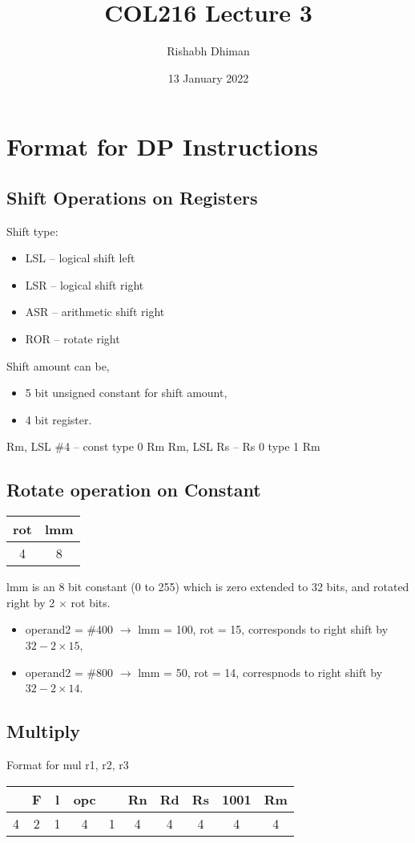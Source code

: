 \documentclass{scrartcl}
\title{COL216 Lecture 3}
\author{Rishabh Dhiman}
\date{13 January 2022}
\begin{document}
\maketitle

\section{Format for DP Instructions}

\subsection{Shift Operations on Registers}
Shift type:
\begin{itemize}
	\item LSL -- logical shift left
	\item LSR -- logical shift right
	\item ASR -- arithmetic shift right
	\item ROR -- rotate right
\end{itemize}
Shift amount can be,
\begin{itemize}
	\item 5 bit unsigned constant for shift amount,
	\item 4 bit register.
\end{itemize}
Rm, LSL \#4 -- const type 0 Rm
Rm, LSL Rs -- Rs 0 type 1 Rm

\subsection{Rotate operation on Constant}
\begin{tabular}{cc}
	\hline
	rot & lmm\\
	\hline
	4 & 8
\end{tabular}

lmm is an 8 bit constant (0 to 255) which is zero extended to 32 bits, and rotated right by 2 $\times$ rot bits.

\begin{itemize}
	\item operand2 = \#400 $\to$ lmm = 100, rot = 15, corresponds to right shift by $32 - 2 \times 15$,
	\item operand2 = \#800 $\to$ lmm = 50, rot = 14, correspnods to right shift by $32 - 2 \times 14$.
\end{itemize}

\subsection{Multiply}
Format for mul r1, r2, r3
\begin{tabular}{|c|c|c|c|c|c|c|c|c|c|}
	\hline
	& F & l & opc & & Rn & Rd & Rs & 1001 & Rm\\
	\hline
	4 & 2 & 1 & 4 & 1 & 4 & 4 & 4 & 4 & 4\\
	\hline
\end{tabular}
\end{document}
